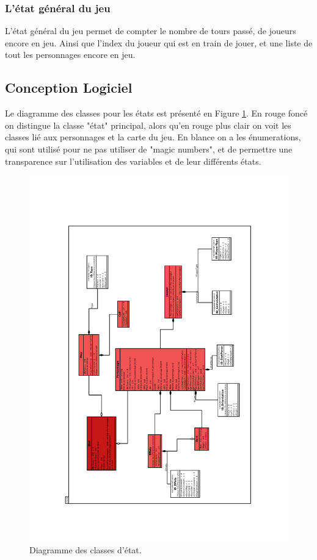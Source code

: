 \documentclass[a4paper,12pt]{article}
\begin{document}
\subsubsection{L'état général du jeu}

L'état général du jeu permet de compter le nombre de tours passé, de joueurs encore en jeu.
Ainsi que l'index du joueur qui est en train de jouer, et une liste de tout les personnages encore en jeu.

\subsection{Conception Logiciel}

Le diagramme des classes pour les états est présenté en Figure \ref{uml:state}. En rouge foncé
on distingue la classe "état" principal, alors qu'en rouge plus clair on voit les classes lié aux personnages 
et la carte du jeu. En blance on a les énumerations, qui sont utilisé pour ne pas utiliser de "magic numbers", 
et de permettre une transparence sur l'utilisation des variables et de leur différents états.

\begin{landscape}
\begin{figure}[p]
\includegraphics[width=0.8\paperwidth,angle=270]{StateUML_1.pdf}
\caption{\label{uml:state}Diagramme des classes d'état.} 
\end{figure}
\end{landscape}
\end{document}
